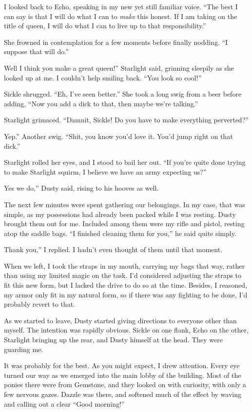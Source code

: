 I looked back to Echo, speaking in my new yet still familiar voice. “The best I can say is that I will do what I can to \textit{make} this honest. If I am taking on the title of queen, I will do what I can to live up to that responsibility.”

She frowned in contemplation for a few moments before finally nodding. “I suppose that will do.”

\leavevmode{}Well I think you make a great queen!” Starlight said, grinning sleepily as she looked up at me. I couldn’t help smiling back. “You look so cool!”

Sickle shrugged. “Eh, I’ve seen better.” She took a long swig from a beer before adding, “Now you add a dick to that, then maybe we’re talking.”

Starlight grimaced. “Damnit, Sickle! Do you have to make everything perverted?”

\leavevmode{}Yep.” Another swig. “Shit, you know you’d love it. You’d jump right on that dick.”

Starlight rolled her eyes, and I stood to bail her out. “If you’re quite done trying to make Starlight squirm, I believe we have an army expecting us?”

\leavevmode{}Yes we do,” Dusty said, rising to his hooves as well.

The next few minutes were spent gathering our belongings. In my case, that was simple, as my possessions had already been packed while I was resting. Dusty brought them out for me. Included among them were my rifle and pistol, resting atop the saddle bags. “I finished cleaning them for you,” he said quite simply.

\leavevmode{}Thank you,” I replied. I hadn’t even thought of them until that moment.

When we left, I took the straps in my mouth, carrying my bags that way, rather than using my limited magic on the task. I’d considered adjusting the straps to fit this new form, but I lacked the drive to do so at the time. Besides, I reasoned, my armor only fit in my natural form, so if there was any fighting to be done, I’d probably revert to that.

As we started to leave, Dusty started giving directions to everyone other than myself. The intention was rapidly obvious. Sickle on one flank, Echo on the other, Starlight bringing up the rear, and Dusty himself at the head. They were guarding me.

It was probably for the best. As you might expect, I drew attention. Every eye turned our way as we emerged into the main lobby of the building. Most of the ponies there were from Gemstone, and they looked on with curiosity, with only a few nervous gazes. Dazzle was there, and softened much of the effect by waving and calling out a clear “Good morning!”

